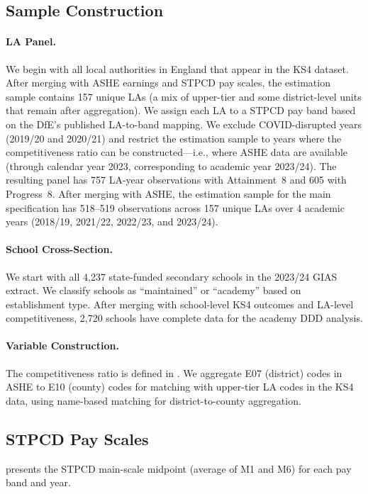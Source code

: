 \documentclass[12pt]{article}
\begin{document}
\subsection{Sample Construction}

\paragraph{LA Panel.} We begin with all local authorities in England that appear in the KS4 dataset. After merging with ASHE earnings and STPCD pay scales, the estimation sample contains 157 unique LAs (a mix of upper-tier and some district-level units that remain after aggregation). We assign each LA to a STPCD pay band based on the DfE's published LA-to-band mapping. We exclude COVID-disrupted years (2019/20 and 2020/21) and restrict the estimation sample to years where the competitiveness ratio can be constructed---i.e., where ASHE data are available (through calendar year 2023, corresponding to academic year 2023/24). The resulting panel has 757 LA-year observations with Attainment~8 and 605 with Progress~8. After merging with ASHE, the estimation sample for the main specification has 518--519 observations across 157 unique LAs over 4 academic years (2018/19, 2021/22, 2022/23, and 2023/24).

\paragraph{School Cross-Section.} We start with all 4,237 state-funded secondary schools in the 2023/24 GIAS extract. We classify schools as ``maintained'' or ``academy'' based on establishment type. After merging with school-level KS4 outcomes and LA-level competitiveness, 2,720 schools have complete data for the academy DDD analysis.

\paragraph{Variable Construction.} The competitiveness ratio is defined in . We aggregate E07 (district) codes in ASHE to E10 (county) codes for matching with upper-tier LA codes in the KS4 data, using name-based matching for district-to-county aggregation.

\subsection{STPCD Pay Scales}

 presents the STPCD main-scale midpoint (average of M1 and M6) for each pay band and year.
\end{document}

